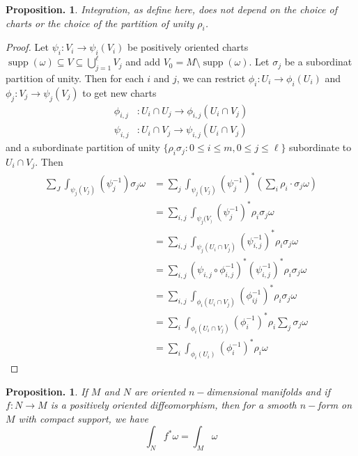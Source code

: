 \documentclass[11pt, a4paper]{memoir}
\theoremstyle{change}
\newtheorem{proposition}[theorem]{Proposition.}
\theoremstyle{plain}
\theoremstyle{nonumberplain}
\newtheorem{proof}{Proof}
\DeclareMathOperator{\supp}{supp}
\numberwithin{equation}{section}
\begin{document}
\begin{proposition}
    Integration, as define here, does not depend on the choice of charts or the choice of the partition of unity $\rho_i$.
\end{proposition}
\begin{proof}
    Let $\psi_i:V_i\to\psi_i(V_i)$ be positively oriented charts $\supp(\omega)\subseteq V\subseteq\bigcup_{j=1}^\ell V_j$ and add $V_0=M\setminus\supp(\omega)$.
    Let $\sigma_j$ be a subordinat partition of unity.
    Then for each $i$ and $j$, we can restrict $\phi_i:U_i\to\phi_i(U_i)$ and $\phi_j:V_j\to\psi_j(V_j)$ to get new charts
    \begin{align*}
        \phi_{i,j}&:U_i\cap U_j\to\phi_{i,j}(U_i\cap V_j)\\
        \psi_{i,j}&:U_i\cap V_j\to\psi_{i,j}(U_i\cap V_j)
    \end{align*}
    and a subordinate partition of unity $\{\rho_i\sigma_j:0\leq i\leq m,0\leq j\leq \ell\}$ subordinate to $U_i\cap V_j$.
    Then
    \begin{align*}
        \sum_J\int_{\psi_j(V_j)}(\psi_j^{-1})\sigma_j\omega &= \sum_j\int_{\psi_j(V_j)}(\psi_j^{-1})^*(\sum_i\rho_i\cdot\sigma_j\omega)\\
                                                            &= \sum_{i,j}\int_{\psi_j(V_)}(\psi_j^{-1})^*\rho_i\sigma_j\omega\\
                                                            &= \sum_{i,j}\int_{\psi_j(U_i\cap V_j)}(\psi_{i,j}^{-1})^*\rho_i\sigma_j\omega\\
                                                            &= \sum_{i,j}(\psi_{i,j}\circ\phi_{i,j}^{-1})^*(\psi_{i,j}^{-1})^*\rho_i\sigma_j\omega\\
                                                            &= \sum_{i,j}\int_{\phi_i(U_i\cap V_j)}(\phi_{ij}^{-1})^*\rho_i\sigma_j\omega\\
                                                            &= \sum_i\int_{\phi_i(U_i\cap V_j)}(\phi_i^{-1})^*\rho_i\sum_j\sigma_j\omega\\
                                                            &= \sum_i\int_{\phi_i(U_i)}(\phi_i^{-1})^*\rho_i\omega
    \end{align*}
\end{proof}
\begin{proposition}
    If $M$ and $N$ are oriented $n-$dimensional manifolds and if $f:N\to M$ is a positively oriented diffeomorphism, then for a smooth $n-$form on $M$ with compact support, we have
    \begin{equation*}
        \int_Nf^*\omega=\int_M\omega
    \end{equation*}
\end{proposition}
\end{document}
